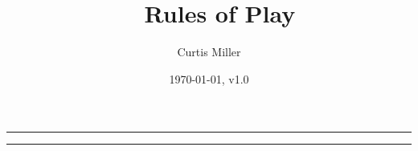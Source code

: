 \documentclass[10pt]{article}
\title{\gametitle~ Rules of Play}
\author{Curtis Miller}
\date{\today, v1.0}
\begin{document}
\maketitle

\begin{multicols}{3}
    
    \begin{center}
        \noindent\rule{0.8\linewidth}{1pt}
    \end{center}
    
    \begin{center}
        \noindent\rule{0.8\linewidth}{1pt}
    \end{center}
    
\end{multicols}
\end{document}
